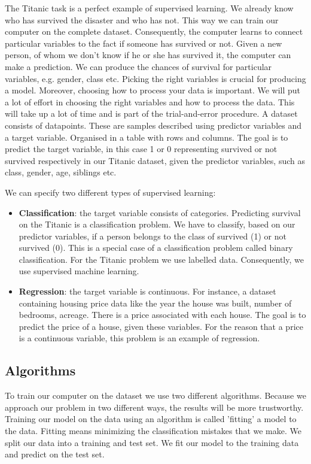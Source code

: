 \documentclass[11pt]{article}
\begin{document}
The Titanic task is a perfect example of supervised learning. We already know who has survived the disaster and who has not. This way we can train our computer on the complete dataset. Consequently, the computer learns to connect particular variables to the fact if someone has survived or not. Given a new person, of whom we don't know if he or she has survived it, the computer can make a prediction. We can produce the chances of survival for particular variables, e.g. gender, class etc. Picking the right variables is crucial for producing a model. Moreover, choosing how to process your data is important. We will put a lot of effort in choosing the right variables and how to process the data. This will take up a lot of time and is part of the trial-and-error procedure.
A dataset consists of datapoints. These are samples described using predictor variables and a target variable. Organised in a table with rows and columns. The goal is to predict the target variable, in this case 1 or 0 representing survived or not survived respectively in our Titanic dataset, given the predictor variables, such as class, gender, age, siblings etc. 

We can specify two different types of supervised learning: 
\begin{itemize}
\item \textbf{Classification}: the target variable consists of categories. Predicting survival on the Titanic is a classification problem. We have to classify, based on our predictor variables, if a person belongs to the class of survived (1) or not survived (0). This is a special case of a classification problem called binary classification. For the Titanic problem we use labelled data. Consequently, we use supervised machine learning.
\item \textbf{Regression}: the target variable is continuous. For instance, a dataset containing housing price data like the year the house was built, number of bedrooms, acreage. There is a price associated with each house. The goal is to predict the price of a house, given these variables. For the reason that a price is a continuous variable, this problem is an example of regression.
\end{itemize}


\subsection{Algorithms}
\label{sec:org5110cc8}
To train our computer on the dataset we use two different algorithms. Because we approach our problem in two different ways, the results will be more trustworthy. Training our model on the data using an algorithm is called 'fitting' a model to the data. Fitting means minimizing the classification mistakes that we make. We split our data into a training and test set. We fit our model to the training data and predict on the test set. 
\end{document}
